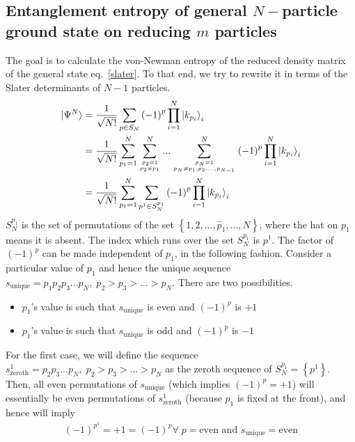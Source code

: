 \documentclass[12pt,twoside]{article}
\numberwithin{equation}{section}
\begin{document}
{\subsection{Entanglement entropy of general \(N-\)particle ground state on reducing \(m\) particles}
The goal is to calculate the von-Newman entropy of the reduced density matrix of the general state eq.~\ref{slater}. To that end, we try to rewrite it in terms of the Slater determinants of \(N-1\) particles.
\begin{equation}\begin{aligned}
	\ket{\Psi^N} &= \frac{1}{\sqrt{N!}}\sum_{p \in S_N} \left( -1 \right) ^p \prod_{i=1}^N \ket{k_{p_i}}_i\\
			&=\frac{1}{\sqrt{N!}}\sum_{p_1=1}^N \sum_{p_2 =1\atop{p_2 \neq p_1}}^N ... \sum_{p_N =1\atop{p_N \neq p_1,p_2,...,p_{N-1}}}^N \left( -1 \right) ^p \prod_{i=1}^N \ket{k_{p_i}}_i\\
				 &=\frac{1}{\sqrt{N!}}\sum_{p_1=1}^N \sum_{p^1 \in S_N^{p_1}} \left( -1 \right) ^p \prod_{i=1}^N \ket{k_{p_i}}_i\\
\end{aligned}\end{equation}
\(S_N^{p_1}\) is the set of permutations of the set \(\left\{1, 2, ..., \hat p_1, ..., N \right\} \), where the hat on \(p_1\) means it is absent. The index which runs over the set \(S_N^{p_1}\) is \(p^1\).
\pb The factor of \(\left(-1\right)^p\) can be made independent of \(p_1\), in the following fashion. Consider a particular value of \(p_1\) and hence the unique sequence \(s_\text{unique}=p_1 p_2 p_3 ... p_N, \;p_2>p_3>...>p_N\). There are two possibilities.
\begin{itemize}
	\item \(p_1\)'s value is such that \(s_\text{unique}\) is even and \(\left( -1 \right) ^p\) is \(+1\)
	\item \(p_1\)'s value is such that \(s_\text{unique}\) is odd and \(\left( -1 \right) ^p\) is \(-1\)
\end{itemize}
For the first case, we will define the sequence \(s^1_\text{zeroth}=p_2 p_3 ... p_N, \;p_2>p_3>...>p_N\) as the zeroth sequence of \(S_N^{p_1} = \left\{ p^1 \right\} \). Then, all even permutations of \(s_\text{unique}\) (which implies \(\left( -1 \right) ^p = +1\)) will essentially be even permutations of \(s^1_\text{zeroth}\) (because \(p_1\) is fixed at the front), and hence will imply 
\begin{equation}\begin{aligned}
	\left( -1 \right)^{p^1} = +1 = \left( -1 \right)^{p} \forall\;p=\text{even} \text{ and }s_\text{unique}=\text{even}

\end{aligned}
\end{equation}}
\end{document}
